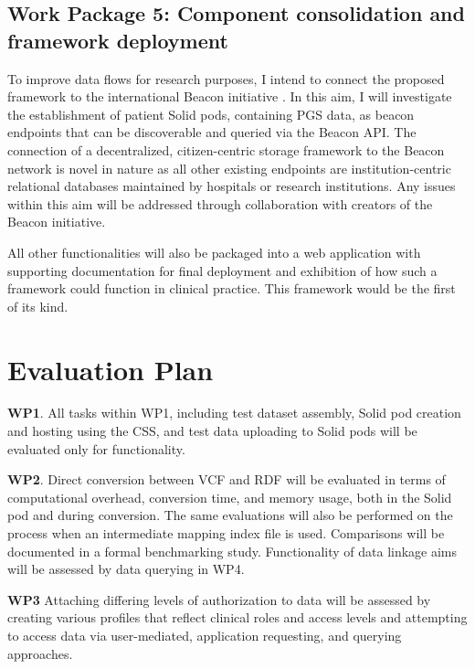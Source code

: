 \documentclass[runningheads]{llncs}
\begin{document}
\subsection{Work Package 5: Component consolidation and framework deployment}

To improve data flows for research purposes, I intend to connect the proposed framework to the international Beacon initiative \cite{rambla_beacon_2022}. 
In this aim, I will investigate the establishment of patient Solid pods, containing PGS data, as beacon endpoints that can be discoverable and queried via the Beacon API. 
The connection of a decentralized, citizen-centric storage framework to the Beacon network is novel in nature as all other existing endpoints are institution-centric relational databases maintained by hospitals or research institutions.
Any issues within this aim will be addressed through collaboration with creators of the Beacon initiative.

All other functionalities will also be packaged into a web application with supporting documentation for final deployment and exhibition of how such a framework could function in clinical practice.
This framework would be the first of its kind.


\section{Evaluation Plan}

\textbf{WP1}.
All tasks within WP1, including test dataset assembly, Solid pod creation and hosting using the CSS, and test data uploading to Solid pods will be evaluated only for functionality.

\textbf{WP2}.
Direct conversion between VCF and RDF will be evaluated in terms of computational overhead, conversion time, and memory usage, both in the Solid pod and during conversion.
The same evaluations will also be performed on the process when an intermediate mapping index file is used. 
Comparisons will be documented in a formal benchmarking study.
Functionality of data linkage aims will be assessed by data querying in WP4.

\textbf{WP3}
Attaching differing levels of authorization to data will be assessed by creating various profiles that reflect clinical roles and access levels and attempting to access data via user-mediated, application requesting, and querying approaches. 
\end{document}
